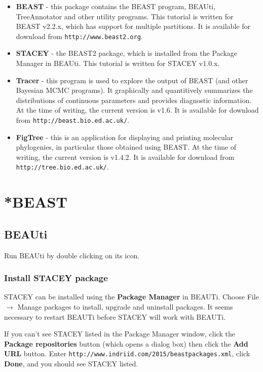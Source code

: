 \documentclass{article}
\newcommand{\BEASTVersion}{2.2.x}
\newcommand{\STACEYVersion}{1.0.x}
\newcommand{\TracerVersion}{1.6}
\newcommand{\FigTreeVersion}{1.4.2}
\begin{document}
\begin{itemize}

\item {\bf BEAST} - this package contains the BEAST program, BEAUti, TreeAnnotator and other utility programs. This tutorial is written for BEAST v{\BEASTVersion}, which has support for multiple partitions. It is available for download from \texttt{http://www.beast2.org}.
\item {\bf STACEY} - the BEAST2 package, which is installed from the Package Manager in BEAUti. This tutorial is written for STACEY v{\STACEYVersion}.
\item {\bf Tracer} - this program is used to explore the output of BEAST (and other Bayesian MCMC programs). It graphically and
quantitively summarizes the distributions of continuous parameters and provides diagnostic information. At the time of
writing, the current version is v{\TracerVersion}. It is available for download from \texttt{http://beast.bio.ed.ac.uk/}.
\item {\bf FigTree} - this is an application for displaying and printing molecular phylogenies, in particular those obtained using
BEAST. At the time of writing, the current version is v{\FigTreeVersion}. It is available for download from \texttt{http://tree.bio.ed.ac.uk/}.
\end{itemize}

\section{*BEAST}


\subsection*{BEAUti}

Run BEAUti by double clicking on its icon. 

\subsubsection*{Install STACEY package}

STACEY can be installed using the {\bf Package Manager} in BEAUTi. Choose File $\to$ Manage packages to install, upgrade and uninstall packages. It seems necessary to restart BEAUTi before STACEY will work with BEAUTi. 

If you can't see STACEY listed in the Package Manager window, click the \textbf{Package repositories} button (which opens a dialog box) then click the \textbf{Add URL} button. Enter \texttt{http://www.indriid.com/2015/beastpackages.xml}, click \textbf{Done}, and you should see STACEY listed.
\end{document}
